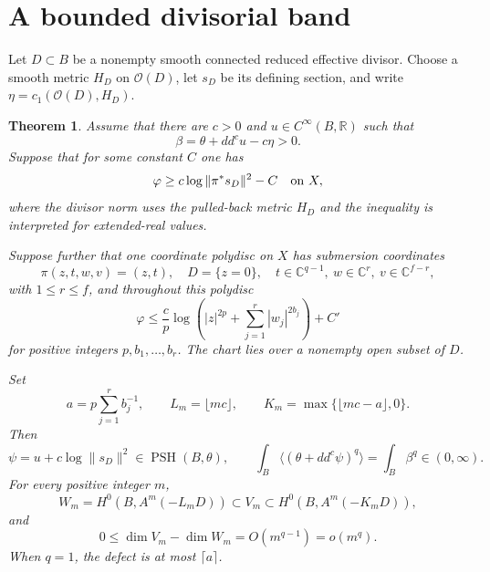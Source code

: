 \documentclass[11pt]{article}
\newtheorem{theorem}{Theorem}
\newcommand{\ddc}{dd^c}
\newcommand{\cO}{\mathcal O}
\newcommand{\PSH}{\operatorname{PSH}}
\begin{document}
\section{A bounded divisorial band}
Let $D\subset B$ be a nonempty smooth connected reduced effective divisor.
Choose a smooth metric $H_D$ on $\cO(D)$, let $s_D$ be its defining section,
and write $\eta=c_1(\cO(D),H_D)$.

\begin{theorem}\label{thm:criterion}
Assume that there are $c>0$ and $u\in C^\infty(B,\mathbb R)$ such that
\begin{equation}\label{eq:positive}
 \beta=\theta+\ddc u-c\eta>0.
\end{equation}
Suppose that for some constant $C$ one has
\begin{equation}\label{eq:global}
 \varphi\geq c\log\|\pi^*s_D\|^2-C
 \quad\hbox{on }X,
\end{equation}
where the divisor norm uses the pulled-back metric $H_D$ and the inequality
is interpreted for extended-real values.

Suppose further that one coordinate polydisc on $X$ has submersion
coordinates
\[
 \pi(z,t,w,v)=(z,t),\quad D=\{z=0\},\quad
 t\in\mathbb C^{q-1},\ w\in\mathbb C^r,\ v\in\mathbb C^{f-r},
\]
with $1\leq r\leq f$, and throughout this polydisc
\begin{equation}\label{eq:witness}
 \varphi\leq\frac cp\log\left(|z|^{2p}+
                  \sum_{j=1}^r|w_j|^{2b_j}\right)+C'
\end{equation}
for positive integers $p,b_1,\ldots,b_r$. The chart lies over a nonempty
open subset of $D$.

Set
\[
 a=p\sum_{j=1}^r b_j^{-1},\qquad
 L_m=\lfloor mc\rfloor,\qquad
 K_m=\max\{\lfloor mc-a\rfloor,0\}.
\]
Then
\begin{equation}\label{eq:reference}
 \psi=u+c\log\|s_D\|^2\in\PSH(B,\theta),\qquad
 \int_B\langle(\theta+\ddc\psi)^q\rangle=\int_B\beta^q\in(0,\infty).
\end{equation}
For every positive integer $m$,
\begin{equation}\label{eq:band}
 W_m=H^0(B,A^m(-L_mD))\subset V_m
                  \subset H^0(B,A^m(-K_mD)),
\end{equation}
and
\begin{equation}\label{eq:defect}
 0\leq\dim V_m-\dim W_m=O(m^{q-1})=o(m^q).
\end{equation}
When $q=1$, the defect is at most $\lceil a\rceil$.
\end{theorem}
\end{document}
